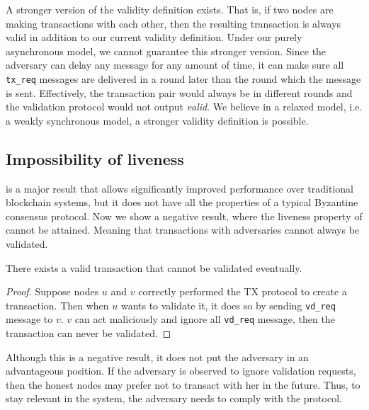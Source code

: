 A stronger version of the validity definition exists.
That is, if two nodes are making transactions with each other,
then the resulting transaction is always valid in addition to our current validity definition.
Under our purely asynchronous model, we cannot guarantee this stronger version.
Since the adversary can delay any message for any amount of time,
it can make sure all \texttt{tx\_req} messages are delivered in a round later than the round which the message is sent.
Effectively, the transaction pair would always be in different rounds and the validation protocol would not output \emph{valid}.
We believe in a relaxed model, i.e. a weakly synchronous model, a stronger validity definition is possible.

\subsection{Impossibility of liveness}
 is a major result that allows significantly improved performance over traditional blockchain systems,
but it does not have all the properties of a typical Byzantine consensus protocol.
Now we show a negative result, where the liveness property of  cannot be attained.
Meaning that transactions with adversaries cannot always be validated.

\begin{lemma}
There exists a valid transaction that cannot be validated eventually.
\end{lemma}
\begin{proof}
Suppose nodes $u$ and $v$ correctly performed the TX protocol to create a transaction.
Then when $u$ wants to validate it, it does so by sending \texttt{vd\_req} message to $v$.
$v$ can act maliciously and ignore all \texttt{vd\_req} message, then the transaction can never be validated.
\end{proof}
Although this is a negative result, it does not put the adversary in an advantageous position.
If the adversary is observed to ignore validation requests, then the honest nodes may prefer not to transact with her in the future.
Thus, to stay relevant in the system, the adversary needs to comply with the protocol.


